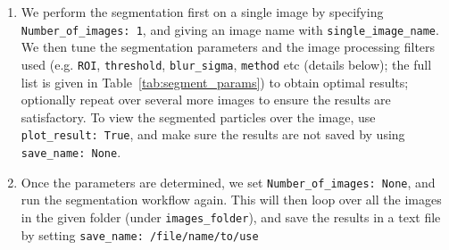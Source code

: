 \documentclass[10pt,a4paper]{article}
\begin{document}
\begin{enumerate}
	\item We perform the segmentation first on a single image by specifying \texttt{Number\_of\_images: 1}, and giving an image name with \texttt{single\_image\_name}. We then tune the segmentation parameters and the image processing filters used (e.g. \texttt{ROI}, \texttt{threshold}, \texttt{blur\_sigma}, \texttt{method} etc (details below); the full list is given in Table~\ref{tab:segment_params}) to obtain optimal results; optionally repeat over several more images to ensure the results are satisfactory. To view the segmented particles over the image, use \texttt{plot\_result: True}, and make sure the results are not saved by using \texttt{save\_name: None}. 
	
	\item Once the parameters are determined, we set \texttt{Number\_of\_images: None}, and run the segmentation workflow again. This will then loop over all the images in the given folder (under \texttt{images\_folder}), and save the results in a text file by setting \texttt{save\_name: /file/name/to/use}
\end{enumerate}
\end{document}
